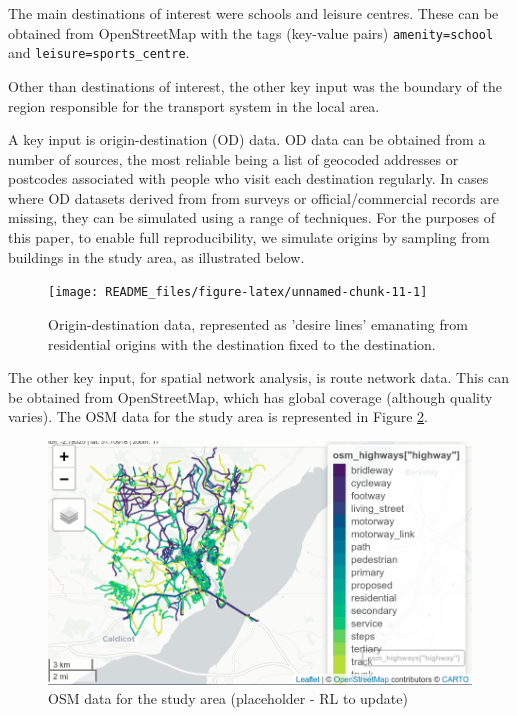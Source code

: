 \documentclass[galley]{jtlu-article-2col}
\begin{document}
The main destinations of interest were schools and leisure centres.
These can be obtained from OpenStreetMap with the tags (key-value pairs) \texttt{amenity=school} and \texttt{leisure=sports\_centre}.

Other than destinations of interest, the other key input was the boundary of the region responsible for the transport system in the local area.

A key input is origin-destination (OD) data.
OD data can be obtained from a number of sources, the most reliable being a list of geocoded addresses or postcodes associated with people who visit each destination regularly.
In cases where OD datasets derived from from surveys or official/commercial records are missing, they can be simulated using a range of techniques.
For the purposes of this paper, to enable full reproducibility, we simulate origins by sampling from buildings in the study area, as illustrated below.

\begin{figure}

{\centering \texttt{[image: README\_files/figure-latex/unnamed-chunk-11-1]} 

}

\caption{Origin-destination data, represented as 'desire lines' emanating from residential origins with the destination fixed to the destination.}\label{fig:unnamed-chunk-11}
\end{figure}

The other key input, for spatial network analysis, is route network data.
This can be obtained from OpenStreetMap, which has global coverage (although quality varies).
The OSM data for the study area is represented in Figure \ref{fig:osminput}.

\begin{figure}

{\centering \includegraphics[width=12.46in]{figures/osm-infra-chepstow} 

}

\caption{OSM data for the study area (placeholder - RL to update)}\label{fig:osminput}
\end{figure}
\end{document}
